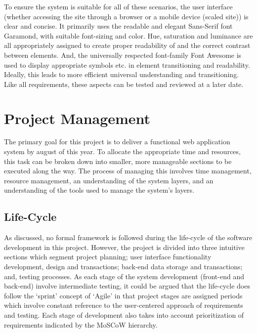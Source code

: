 \documentclass[11pt, english]{article}
\begin{document}
	To ensure the system is suitable for all of these scenarios, the user interface (whether accessing the site through a browser or a mobile device (scaled site)) is clear and concise. It primarily uses the readable and elegant Sans-Serif font Garamond, with suitable font-sizing and color. Hue, saturation and luminance are all appropriately assigned to create proper readability of and the correct contrast between elements. And, the universally respected font-family Font Awesome is used to display appropriate symbols etc. in element transitioning and readability. Ideally, this leads to more efficient universal understanding and transitioning. Like all requirements, these aspects can be tested and reviewed at a later date.

\newpage

\section{Project Management}

	The primary goal for this project is to deliver a functional web application system by august of this year. To allocate the appropriate time and resources, this task can be broken down into smaller, more manageable sections to be executed along the way. The process of managing this involves time management, resource management, an understanding of the system layers, and an understanding of the tools used to manage the system's layers.

	\subsection{Life-Cycle}

	As discussed, no formal framework is followed during the life-cycle of the software development in this project. However, the project is divided into three intuitive sections which segment project planning; user interface functionality development, design and transactions; back-end data storage and transactions; and, testing processes. As each stage of the system development (front-end and back-end) involve intermediate testing, it could be argued that the life-cycle does follow the `sprint' concept of `Agile' in that project stages are assigned periods which involve constant reference to the user-centered approach of requirements and testing. Each stage of development also takes into account prioritization of requirements indicated by the MoSCoW hierarchy.\\
	
\end{document}
